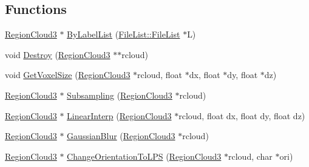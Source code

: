 \subsection*{Functions}
\begin{DoxyCompactItemize}
\item 
\hyperlink{namespacegft_1_1RegionCloud3_ae97ab7136c2a2a97ccc56e60025d0a1a}{Region\-Cloud3} $\ast$ \hyperlink{namespacegft_1_1RegionCloud3_aefa1ec9c08d352b7bb8487409e7c891e}{By\-Label\-List} (\hyperlink{namespacegft_1_1FileList_a3a0ba3f59376d46215f21160690c6be1}{File\-List\-::\-File\-List} $\ast$L)
\item 
void \hyperlink{namespacegft_1_1RegionCloud3_a7e10254e9e4ed6b3fa964be54193cad5}{Destroy} (\hyperlink{namespacegft_1_1RegionCloud3_ae97ab7136c2a2a97ccc56e60025d0a1a}{Region\-Cloud3} $\ast$$\ast$rcloud)
\item 
void \hyperlink{namespacegft_1_1RegionCloud3_a013ccdee3c85d5742cd274d119868de5}{Get\-Voxel\-Size} (\hyperlink{namespacegft_1_1RegionCloud3_ae97ab7136c2a2a97ccc56e60025d0a1a}{Region\-Cloud3} $\ast$rcloud, float $\ast$dx, float $\ast$dy, float $\ast$dz)
\item 
\hyperlink{namespacegft_1_1RegionCloud3_ae97ab7136c2a2a97ccc56e60025d0a1a}{Region\-Cloud3} $\ast$ \hyperlink{namespacegft_1_1RegionCloud3_ad1b53e79eaf686055ccf0151b81c9867}{Subsampling} (\hyperlink{namespacegft_1_1RegionCloud3_ae97ab7136c2a2a97ccc56e60025d0a1a}{Region\-Cloud3} $\ast$rcloud)
\item 
\hyperlink{namespacegft_1_1RegionCloud3_ae97ab7136c2a2a97ccc56e60025d0a1a}{Region\-Cloud3} $\ast$ \hyperlink{namespacegft_1_1RegionCloud3_ad7ba9e9a3b4a5cc73d98ec7be8beb267}{Linear\-Interp} (\hyperlink{namespacegft_1_1RegionCloud3_ae97ab7136c2a2a97ccc56e60025d0a1a}{Region\-Cloud3} $\ast$rcloud, float dx, float dy, float dz)
\item 
\hyperlink{namespacegft_1_1RegionCloud3_ae97ab7136c2a2a97ccc56e60025d0a1a}{Region\-Cloud3} $\ast$ \hyperlink{namespacegft_1_1RegionCloud3_aea52f2a023a202709be9f6f6a02dd00d}{Gaussian\-Blur} (\hyperlink{namespacegft_1_1RegionCloud3_ae97ab7136c2a2a97ccc56e60025d0a1a}{Region\-Cloud3} $\ast$rcloud)
\item 
\hyperlink{namespacegft_1_1RegionCloud3_ae97ab7136c2a2a97ccc56e60025d0a1a}{Region\-Cloud3} $\ast$ \hyperlink{namespacegft_1_1RegionCloud3_a53b90d68aeda078ea5802693f304c761}{Change\-Orientation\-To\-L\-P\-S} (\hyperlink{namespacegft_1_1RegionCloud3_ae97ab7136c2a2a97ccc56e60025d0a1a}{Region\-Cloud3} $\ast$rcloud, char $\ast$ori)
\item 
$$
\end{DoxyCompactItemize}
